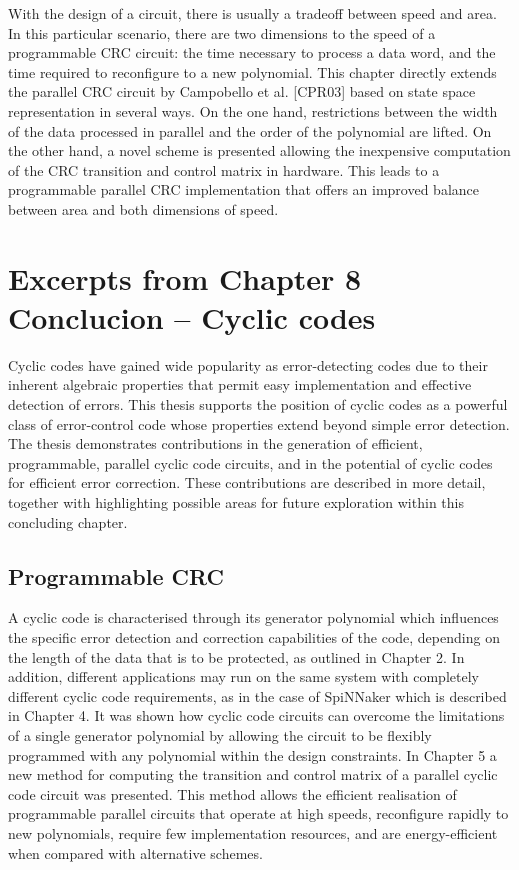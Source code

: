 \documentclass[oneside, a4paper, 11pt]{memoir}
\begin{document}
With the design of a circuit, there is usually a tradeoff between speed and area. In this particular scenario, there are two dimensions to the speed of a programmable CRC circuit: the time necessary to process a data word, and the time required to reconfigure to a new polynomial. This chapter directly extends the parallel CRC circuit by Campobello et al. [CPR03] based on state space representation in several ways. On the one hand, restrictions between the width of the data processed in parallel and the order of the polynomial are lifted. On the other hand, a novel scheme is presented allowing the inexpensive computation of the CRC transition and control matrix in hardware. This leads to a programmable parallel CRC implementation that offers an improved balance between area and both dimensions of speed.

\newpage
\section{Excerpts from Chapter 8 Conclucion -- Cyclic codes}
Cyclic codes have gained wide popularity as error-detecting codes due to their inherent algebraic properties that permit easy implementation and effective detection of errors. This thesis supports the position of cyclic codes as a powerful class of error-control code whose properties extend beyond simple error detection. The thesis demonstrates contributions in the generation of efficient, programmable, parallel cyclic code circuits, and in the potential of cyclic codes for efficient error correction. These contributions are described in more detail, together with highlighting possible areas for future exploration within this concluding chapter.

\subsection{Programmable CRC}
A cyclic code is characterised through its generator polynomial which influences the specific error detection and correction capabilities of the code, depending on the length of the data that is to be protected, as outlined in Chapter 2. In addition, different applications may run on the same system with completely different cyclic code requirements, as in the case of SpiNNaker which is described in Chapter 4. It was shown how cyclic code circuits can overcome the limitations of a single generator polynomial by allowing the circuit to be flexibly programmed with any polynomial within the design constraints. In Chapter 5 a new method for computing the transition and control matrix of a parallel cyclic code circuit was presented. This method allows the efficient realisation of programmable parallel circuits that operate at high speeds, reconfigure rapidly to new polynomials, require few implementation resources, and are energy-efficient when compared with alternative schemes.
\end{document}
